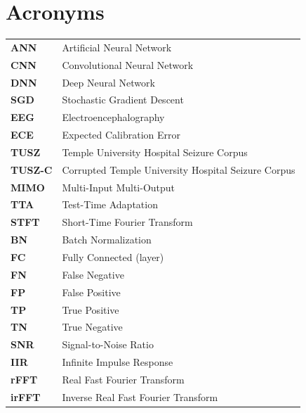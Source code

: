 \chapter{Acronyms}
 

\begin{longtable}[l]{@{}ll}
\textbf{ANN} & Artificial Neural Network \\
\textbf{CNN} & Convolutional Neural Network \\
\textbf{DNN} & Deep Neural Network \\
\textbf{SGD} & Stochastic Gradient Descent \\
\textbf{EEG} & Electroencephalography \\
\textbf{ECE} & Expected Calibration Error \\
\textbf{TUSZ} & Temple University Hospital Seizure Corpus \\
\textbf{TUSZ-C} & Corrupted Temple University Hospital Seizure Corpus \\
\textbf{MIMO} & Multi-Input Multi-Output \\
\textbf{TTA} & Test-Time Adaptation \\
\textbf{STFT} & Short-Time Fourier Transform \\
\textbf{BN} & Batch Normalization \\
\textbf{FC} & Fully Connected (layer) \\
\textbf{FN} & False Negative \\
\textbf{FP} & False Positive \\
\textbf{TP} & True Positive \\
\textbf{TN} & True Negative \\
\textbf{SNR} & Signal-to-Noise Ratio \\
\textbf{IIR} & Infinite Impulse Response \\
\textbf{rFFT} & Real Fast Fourier Transform \\
\textbf{irFFT} & Inverse Real Fast Fourier Transform \\
\end{longtable}

